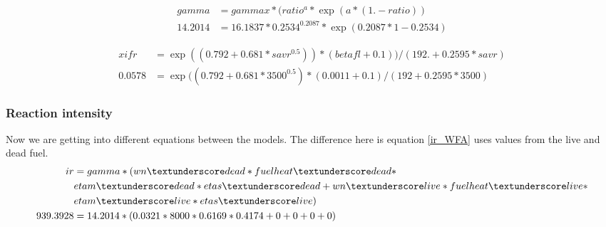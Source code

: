 \documentclass{article}
\newcommand\und{\textunderscore}
\begin{document}
\begin{equation}
	\label{gamma_WFA}
	\begin{split}
		gamma         &= gammax*(ratio^a * \exp(a*(1.-ratio)) \\
		14.2014 &= 16.1837 * 0.2534 ^ {0.2087} * \exp(0.2087 * 1 - 0.2534)
	\end{split}
\end{equation}


\begin{equation}
	\label{xifr_WFA}
	\begin{split}
		xifr          &= \exp( (0.792 + 0.681*savr^{0.5})) * (betafl+0.1)) /(192. + 0.2595*savr) \\
               0.0578 &= \exp((0.792 + 0.681 * 3500 ^ {0.5}) * (0.0011 + 0.1) / (192 + 0.2595 * 3500)
	\end{split}
\end{equation}


\subsubsection{Reaction intensity}

Now we are getting into different equations between the models. The difference here is equation \ref{ir_WFA} uses values from the live and dead fuel. 
\begin{equation}
	\label{ir_WFA}
	\begin{split}
		ir            &= gamma * (wn\und dead * fuelheat\und dead * \\
		& etam\und dead * etas\und dead + wn\und live * fuelheat\und live * \\
		&etam\und live * etas\und live) \\
        939.3928 &= 14.2014 * (0.0321 * 8000 * 0.6169 * 0.4174 + 0 + 0 + 0 + 0)
	\end{split}
\end{equation}
\end{document}
